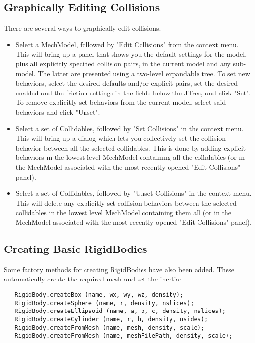 \documentclass{article}
\begin{document}
\subsection*{Graphically Editing Collisions}

There are several ways to graphically edit collisions.

\begin{itemize}

\item Select a MechModel, followed by {\sf "Edit Collisions"} from the context 
menu. This will bring up a panel that shows you the default settings 
for the model, plus all explicitly specified collision pairs, in the 
current model and any sub-model. The latter are presented using a
 two-level expandable tree. To set new behaviors, select the desired 
defaults and/or explicit pairs, set the desired enabled and the
friction settings in the fields below the JTree, and click {\sf "Set"}. 
To remove explicitly set behaviors from the current model, select said 
behaviors and click {\sf "Unset"}.

\item Select a set of Collidables, followed by {\sf "Set Collisions"} in the 
context menu. This will bring up a dialog which lets you collectively 
set the collision behavior between all the selected collidables. This 
is done by adding explicit behaviors in the lowest level MechModel 
containing all the collidables (or in the MechModel associated with
the most recently opened {\sf "Edit Collisions"} panel).

\item Select a set of Collidables, followed by {\sf "Unset Collisions"} in the 
context menu. This will delete any explicitly set collision behaviors 
between the selected collidables in the lowest level MechModel
containing them all (or in the MechModel associated with the most 
recently opened {\sf "Edit Collisions"} panel). 

\end{itemize}

\subsection*{Creating Basic RigidBodies}

Some factory methods for creating RigidBodies have also been added. 
These automatically create the required mesh and set the inertia:

\begin{lstlisting}
   RigidBody.createBox (name, wx, wy, wz, density);
   RigidBody.createSphere (name, r, density, nslices);
   RigidBody.createEllipsoid (name, a, b, c, density, nslices);
   RigidBody.createCylinder (name, r, h, density, nsides);
   RigidBody.createFromMesh (name, mesh, density, scale);
   RigidBody.createFromMesh (name, meshFilePath, density, scale);
\end{lstlisting}
\end{document}
